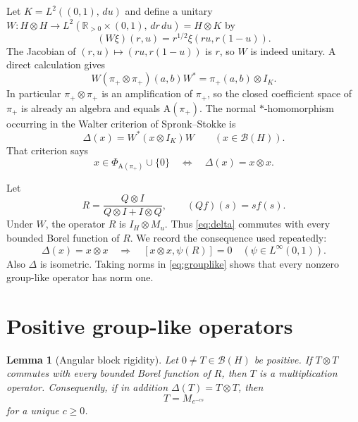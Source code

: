 \documentclass[11pt]{article}
\newtheorem{lemma}[theorem]{Lemma}
\newcommand{\R}{\mathbb R}
\newcommand{\B}{\mathcal B}
\newcommand{\A}{\mathrm A}
\newcommand{\dd}{\,d}
\newcommand{\PhiA}{\Phi_{\A(\pi_+)}}
\begin{document}
Let $K=L^2((0,1),\dd u)$ and define a unitary
$W:H\otimes H\to L^2(\R_{>0}\times(0,1),\dd r\dd u)=H\otimes K$ by
\begin{equation}\label{eq:W}
 (W\xi)(r,u)=r^{1/2}\xi(ru,r(1-u)).
\end{equation}
The Jacobian of $(r,u)\mapsto(ru,r(1-u))$ is $r$, so $W$ is indeed unitary.
A direct calculation gives
\begin{equation}\label{eq:intertwine}
 W(\pi_+\otimes\pi_+)(a,b)W^*=\pi_+(a,b)\otimes I_K.
\end{equation}
In particular $\pi_+\otimes\pi_+$ is an amplification of $\pi_+$, so the
closed coefficient space of $\pi_+$ is already an algebra and equals
$\A(\pi_+)$.  The
normal $*$-homomorphism occurring in the Walter criterion of
Spronk--Stokke is
\begin{equation}\label{eq:delta}
 \Delta(x)=W^*(x\otimes I_K)W\qquad(x\in\B(H)).
\end{equation}
That criterion says
\begin{equation}\label{eq:grouplike}
 x\in\PhiA\cup\{0\}
 \quad\Longleftrightarrow\quad
 \Delta(x)=x\otimes x.
\end{equation}

Let
\[
 R=\frac{Q\otimes I}{Q\otimes I+I\otimes Q},
 \qquad (Qf)(s)=sf(s).
\]
Under $W$, the operator $R$ is $I_H\otimes M_u$.  Thus \eqref{eq:delta}
commutes with every bounded Borel function of $R$.  We record the consequence
used repeatedly:
\begin{equation}\label{eq:angular}
 \Delta(x)=x\otimes x
 \quad\Longrightarrow\quad
 [x\otimes x,\psi(R)]=0
 \quad(\psi\in L^\infty(0,1)).
\end{equation}
Also $\Delta$ is isometric.  Taking norms in \eqref{eq:grouplike} shows that
every nonzero group-like operator has norm one.

\section{Positive group-like operators}

\begin{lemma}[Angular block rigidity]\label{lem:positive}
Let $0\neq T\in\B(H)$ be positive.  If $T\otimes T$ commutes with every
bounded Borel function of $R$, then $T$ is a multiplication operator.
Consequently, if in addition $\Delta(T)=T\otimes T$, then
\[
 T=M_{e^{-cs}}
\]
for a unique $c\geq0$.
\end{lemma}
\end{document}
